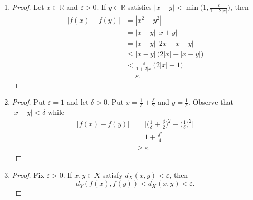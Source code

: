 \documentclass{article}
\newcommand{\R}{\mathbb{R}}
\renewcommand{\epsilon}{\varepsilon}
\begin{document}
\begin{enumerate}
\begin{proof}
			Fix $x\in X$ and let $\epsilon>0$. Since $f$ is uniformly continuous, there is a $\delta>0$ for which
			\[
				d_X(x,y) < \delta \implies d_Y(f(x),f(y))<\epsilon.
			\]
		\end{proof}
	\item
		\begin{proof}
			Let $x\in\R$ and $\epsilon>0$. If $y\in\R$ satisfies $|x-y|<\min\big(1,\frac{\epsilon}{1+2|x|}\big)$, then
			\begin{align*}
				|f(x)-f(y)|
					&=	|x^2-y^2|					\\
					&=	|x-y|\,|x+y|				\\
					&=	|x-y|\,|2x-x+y|				\\
					&\leq	|x-y|\,\big(2|x| + |x-y| \big)		\\
					&<	\frac{\epsilon}{1+2|x|}  \big(2|x|+1\big)	\\
					&=	\epsilon.
			\end{align*}
		\end{proof}
	\item 
		\begin{proof}
			Put $\epsilon=1$ and let $\delta>0$. Put $x=\frac{1}{\delta}+\frac{\delta}{2}$ and $y=\frac{1}{\delta}$. Observe that $|x-y|<\delta$ while
			\begin{align*}
				|f(x)-f(y)|
					&=	\Big|\Big(\frac{1}{\delta}+\frac{\delta}{2}\Big)^2 - \Big(\frac{1}{\delta}\Big)^2\Big|		\\
					&=	1 + \frac{\delta^2}{4}										\\
					&\geq	\epsilon.
			\end{align*}
		\end{proof}
	\item 
		\begin{proof}
			Fix $\epsilon>0$. If $x,y\in X$ satisfy $d_X(x,y)< \epsilon$, then
			\[
				d_Y(f(x),f(y)) < d_X(x,y) < \epsilon.
			\]
		\end{proof}
\end{enumerate}
\end{document}
